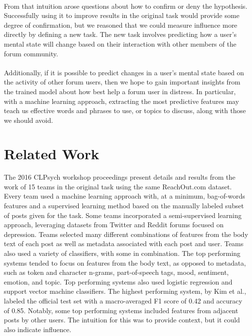 \documentclass{article}
\begin{document}
\paragraph{}From that intuition arose questions about how to confirm or deny the hypothesis. Successfully using it to improve results in the original task would provide some degree of confirmation, but we reasoned that we could measure influence more directly by defining a new task. The new task involves predicting how a user's mental state will change based on their interaction with other members of the forum community.

\paragraph{}Additionally, if it is possible to predict changes in a user's mental state based on the activity of other forum users, then we hope to gain important insights from the trained model about how best help a forum user in distress. In particular, with a machine learning approach, extracting the most predictive features may teach us effective words and phrases to use, or topics to discuss, along with those we should avoid.

\section{Related Work}

\paragraph{}The 2016 CLPsych workshop proceedings present details and results from the work of 15 teams in the original task using the same ReachOut.com dataset. Every team used a machine learning approach with, at a minimum, bag-of-words features and a supervised learning method based on the manually labeled subset of posts given for the task. Some teams incorporated a semi-supervised learning approach, leveraging datasets from Twitter and Reddit forums focused on depression. Teams selected many different combinations of features from the body text of each post as well as metadata associated with each post and user. Teams also used a variety of classifiers, with some in combination\cite{milne}. The top performing systems tended to focus on features from the body text, as opposed to metadata, such as token and character n-grams, part-of-speech tags, mood, sentiment, emotion, and topic. Top performing systems also used logistic regression and support vector machine classifiers. The highest performing system, by Kim et al., labeled the official test set with a macro-averaged F1 score of 0.42 and accuracy of 0.85\cite{kim}. Notably, some top performing systems included features from adjacent posts by other users. The intuition for this was to provide context, but it could also indicate influence.
\end{document}
